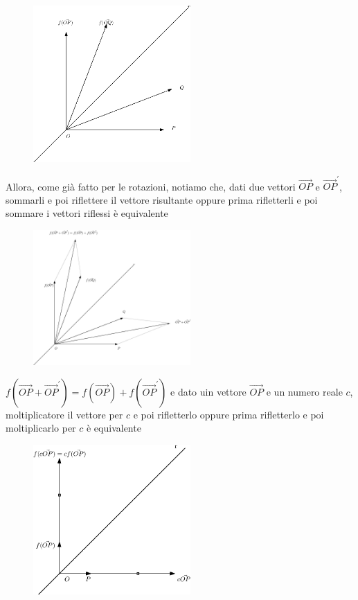 \begin{definizione}
\begin{esempio}
    \begin{figure}[th]
      \centering
        \includegraphics[width=6cm]{img/finiti/imgex4-2-4.eps}
    \end{figure}   
    Allora, come già fatto per le rotazioni, notiamo che, dati due vettori $\vec{OP}$ e $\vec{OP}^\prime$,
    sommarli e poi riflettere il vettore risultante oppure prima rifletterli e poi sommare i vettori riflessi
    è equivalente
    \clearpage
    \begin{figure}[th]
      \centering
        \includegraphics[width=6cm]{img/finiti/imgex4-2-5.eps}
    \end{figure}
    $f\left(\vec{OP}+\vec{OP}^\prime\right)=f\left(\vec{OP}\right)+f\left(\vec{OP}^\prime\right)$ e
    dato uin vettore $\vec{OP}$ e un numero
    reale $c$, moltiplicatore il vettore per $c$ e poi rifletterlo oppure prima rifletterlo e poi moltiplicarlo
    per $c$ è equivalente
    \begin{figure}[th]
      \centering
        \includegraphics[width=6cm]{img/finiti/imgex4-2-6.eps}
    \end{figure}
      

\end{esempio}
\end{definizione}
